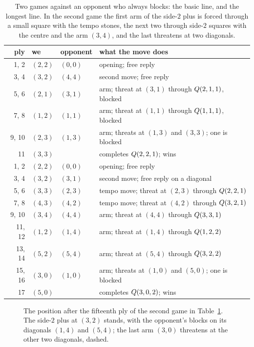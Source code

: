 \documentclass[11pt]{amsart}
\theoremstyle{definition}
\theoremstyle{remark}
\begin{document}
\begin{table}[ht]
\centering
\small
\begin{tabular}{rllp{}}
\toprule
ply & we & opponent & what the move does \\
\midrule
1, 2 & $(2,2)$ & $(0,0)$ & opening; free reply \\
3, 4 & $(3,2)$ & $(4,4)$ & second move; free reply \\
5, 6 & $(2,1)$ & $(3,1)$ & arm; threat at $(3,1)$ through $Q(2,1,1)$, blocked \\
7, 8 & $(1,2)$ & $(1,1)$ & arm; threat at $(1,1)$ through $Q(1,1,1)$, blocked \\
9, 10 & $(2,3)$ & $(1,3)$ & arm; threats at $(1,3)$ and $(3,3)$; one is blocked \\
11 & $(3,3)$ & & completes $Q(2,2,1)$; wins \\
\midrule
1, 2 & $(2,2)$ & $(0,0)$ & opening; free reply \\
3, 4 & $(3,2)$ & $(3,1)$ & second move; free reply on a diagonal \\
5, 6 & $(3,3)$ & $(2,3)$ & tempo move; threat at $(2,3)$ through $Q(2,2,1)$ \\
7, 8 & $(4,3)$ & $(4,2)$ & tempo move; threat at $(4,2)$ through $Q(3,2,1)$ \\
9, 10 & $(3,4)$ & $(4,4)$ & arm; threat at $(4,4)$ through $Q(3,3,1)$ \\
11, 12 & $(1,2)$ & $(1,4)$ & arm; threat at $(1,4)$ through $Q(1,2,2)$ \\
13, 14 & $(5,2)$ & $(5,4)$ & arm; threat at $(5,4)$ through $Q(3,2,2)$ \\
15, 16 & $(3,0)$ & $(1,0)$ & arm; threats at $(1,0)$ and $(5,0)$; one is blocked \\
17 & $(5,0)$ & & completes $Q(3,0,2)$; wins \\
\bottomrule
\end{tabular}
\medskip
\caption{Two games against an opponent who always blocks: the basic
line, and the longest line. In the second game the first arm of the
side-$2$ plus is forced through a small square with the tempo stones,
the next two through side-$2$ squares with the centre and the arm
$(3,4)$, and the last threatens at two diagonals.}
\label{tab:games}
\end{table}

\begin{figure}[ht]
\centering
{}
\caption{The position after the fifteenth ply of the second game in
Table~\ref{tab:games}. The side-$2$ plus at $(3,2)$ stands, with the
opponent's blocks on its diagonals $(1,4)$ and $(5,4)$; the last arm
$(3,0)$ threatens at the other two diagonals, dashed.}
\label{fig:tempoend}
\end{figure}
\end{document}
